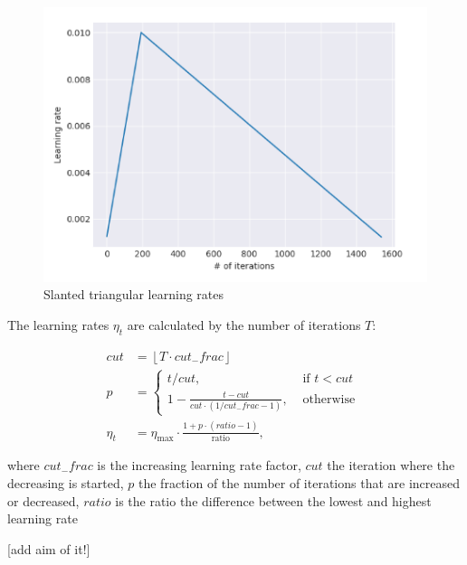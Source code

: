 \documentclass[]{krantz}
\begin{document}
\begin{figure}

{\centering \includegraphics[width=0.6\linewidth]{figures/02-01-transfer-learning-for-nlp-1/ulmfit-stlr} 

}

\caption{Slanted triangular learning rates}\label{fig:ch21-figure06}
\end{figure}

The learning rates \(\eta_{t}\) are calculated by the number of iterations \(T\): \newline

\[\begin{aligned}
c u t &=\left\lfloor T \cdot c u t_{-} f r a c\right\rfloor \\
p &=\left\{\begin{array}{ll}
t / c u t, & \text { if } t<c u t \\
1-\frac{t-c u t}{c u t \cdot\left(1 / c u t_{-} f r a c-1\right)}, & \text { otherwise }
\end{array}\right.\\
\eta_{t} &=\eta_{\max } \cdot \frac{1+p \cdot(r a t i o-1)}{\text {ratio}}, 
\end{aligned}\]

where \(c u t_{-} f r a c\) is the increasing learning rate factor, \(c u t\) the iteration where the decreasing is started, \(p\) the fraction of the number of iterations that are increased or decreased, \(ratio\) is the ratio the difference between the lowest and highest learning rate

{[}add aim of it!{]}
\end{document}

